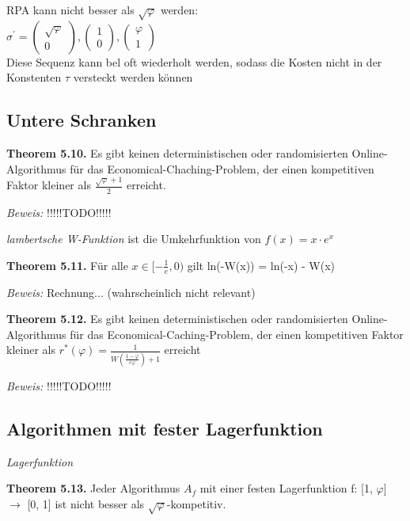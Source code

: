 RPA kann nicht besser als $\sqrt{\varphi}$ werden: \\
$\sigma^{'} = \left(\begin{array}{c} \sqrt{\varphi} \\ 0 \end{array}\right), \left(\begin{array}{c} 1 \\ 0 \end{array}\right), \left(\begin{array}{c} \varphi \\ 1 \end{array}\right)$ \\
Diese Sequenz kann bel oft wiederholt werden, sodass die Kosten nicht in der Konstenten $\tau$ versteckt werden können

\subsection{Untere Schranken}

\textbf{Theorem 5.10.} Es gibt keinen deterministischen oder randomisierten Online-Algorithmus für das Economical-Chaching-Problem, der einen kompetitiven Faktor kleiner als $\frac{\sqrt{\varphi} +1}{2}$ erreicht.

\textit{Beweis:} !!!!!TODO!!!!!

\textit{lambertsche W-Funktion} ist die Umkehrfunktion von $f(x) = x \cdot e^{x}$

\textbf{Theorem 5.11.} Für alle $x \in [-\frac{1}{e}, 0)$ gilt ln(-W(x)) = ln(-x) - W(x)

\textit{Beweis:} Rechnung... (wahrscheinlich nicht relevant)

\textbf{Theorem 5.12.} Es gibt keinen deterministischen oder randomisierten Online-Algorithmus für das Economical-Caching-Problem, der einen kompetitiven Faktor kleiner als $r^{*}(\varphi) = \frac{1}{W(\frac{1-\varphi}{e\varphi})+1}$ erreicht

\textit{Beweis:} !!!!!TODO!!!!!

\subsection{Algorithmen mit fester Lagerfunktion}

\textit{Lagerfunktion}

\textbf{Theorem 5.13.} Jeder Algorithmus $A_{f}$ mit einer festen Lagerfunktion f: [1, $\varphi$] $\to$ [0, 1] ist nicht besser als $\sqrt{\varphi}$-kompetitiv.

